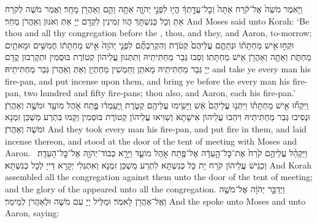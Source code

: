 {וַיֹּ֤אמֶר מֹשֶׁה֙ אֶל־קֹ֔רַח אַתָּה֙ וְכׇל־עֲדָ֣תְךָ֔ הֱי֖וּ לִפְנֵ֣י יְהֹוָ֑ה אַתָּ֥ה וָהֵ֛ם וְאַהֲרֹ֖ן מָחָֽר׃
}
{וַאֲמַר מֹשֶׁה לְקֹרַח אַתְּ וְכָל כְּנִשְׁתָּךְ הֲווֹ זְמִינִין לִקְדָם יְיָ אַתְּ וְאִנּוּן וְאַהֲרֹן מְחַר׃}
{And Moses said unto Korah: ‘Be thou and all thy congregation before the \lord, thou, and they, and Aaron, to-morrow;}{}
{וּקְח֣וּ \legarmeh  אִ֣ישׁ מַחְתָּת֗וֹ וּנְתַתֶּ֤ם עֲלֵיהֶם֙ קְטֹ֔רֶת וְהִקְרַבְתֶּ֞ם לִפְנֵ֤י יְהֹוָה֙ אִ֣ישׁ מַחְתָּת֔וֹ חֲמִשִּׁ֥ים וּמָאתַ֖יִם מַחְתֹּ֑ת וְאַתָּ֥ה וְאַהֲרֹ֖ן אִ֥ישׁ מַחְתָּתֽוֹ׃
}
{וְסַבוּ גְּבַר מַחְתִּיתֵיהּ וְתִתְּנוּן עֲלֵיהוֹן קְטוֹרֶת בּוּסְמִין וּתְקָרְבוּן קֳדָם יְיָ גְּבַר מַחְתִּיתֵיהּ מָאתַן וְחַמְשִׁין מַחְתְּיָן וְאַתְּ וְאַהֲרֹן גְּבַר מַחְתִּיתֵיהּ׃}
{and take ye every man his fire-pan, and put incense upon them, and bring ye before the \lord\space every man his fire-pan, two hundred and fifty fire-pans; thou also, and Aaron, each his fire-pan.’}{}
{וַיִּקְח֞וּ אִ֣ישׁ מַחְתָּת֗וֹ וַיִּתְּנ֤וּ עֲלֵיהֶם֙ אֵ֔שׁ וַיָּשִׂ֥ימוּ עֲלֵיהֶ֖ם קְטֹ֑רֶת וַֽיַּעַמְד֗וּ פֶּ֛תַח אֹ֥הֶל מוֹעֵ֖ד וּמֹשֶׁ֥ה וְאַהֲרֹֽן׃}
{וּנְסִיבוּ גְּבַר מַחְתִּיתֵיהּ וִיהַבוּ עֲלֵיהוֹן אִישָׁתָא וְשַׁוִּיאוּ עֲלֵיהוֹן קְטוֹרֶת בּוּסְמִין וְקָמוּ בִּתְרַע מַשְׁכַּן זִמְנָא וּמֹשֶׁה וְאַהֲרֹן׃}
{And they took every man his fire-pan, and put fire in them, and laid incense thereon, and stood at the door of the tent of meeting with Moses and Aaron.}{}
{וַיַּקְהֵ֨ל עֲלֵיהֶ֥ם קֹ֙רַח֙ אֶת־כׇּל־הָ֣עֵדָ֔ה אֶל־פֶּ֖תַח אֹ֣הֶל מוֹעֵ֑ד וַיֵּרָ֥א כְבוֹד־יְהֹוָ֖ה אֶל־כׇּל־הָעֵדָֽה׃ \setuma 
{}}
{וְכַנֵּישׁ עֲלֵיהוֹן קֹרַח יָת כָּל כְּנִשְׁתָּא לִתְרַע מַשְׁכַּן זִמְנָא וְאִתְגְּלִי יְקָרָא דַּייָ לְכָל כְּנִשְׁתָּא׃}
{And Korah assembled all the congregation against them unto the door of the tent of meeting; and the glory of the \lord\space appeared unto all the congregation.}{}
{וַיְדַבֵּ֣ר יְהֹוָ֔ה אֶל־מֹשֶׁ֥ה וְאֶֽל־אַהֲרֹ֖ן לֵאמֹֽר׃}
{וּמַלֵּיל יְיָ עִם מֹשֶׁה וּלְאַהֲרֹן לְמֵימַר׃}
{And the \lord\space spoke unto Moses and unto Aaron, saying:}{}
